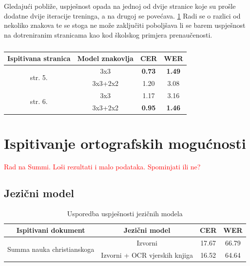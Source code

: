 \documentclass[zavrsnirad]{fer}
\begin{document}
Gledajući pobliže, uspješnost opada na jednoj od dvije stranice koje su prošle dodatne dvije iteracije treninga, a na drugoj se povećava. \ref{tab:pages5and6} Radi se o razlici od nekoliko znakova te se stoga ne može zaključiti poboljšava li se barem uspješnost na dotreniranim stranicama kao kod školskog primjera prenaučenosti.


\bgroup
\def\arraystretch{1.25}
\begin{table}[hbt]
	\centering
	\begin{tabular}{|c|c|c|c|}
		\hline
		\textbf{Ispitivana stranica} & \textbf{Model znakovlja} & \textbf{CER} & \textbf{WER} \\ \hline
		\multirow{2}{*}{str. 5.} & 3x3 & \textbf{0.73} & \textbf{1.49} \\ \cline{2-4}
								 & 3x3+2x2 & 1.20 & 3.08 \\ \hline
		\multirow{2}{*}{str. 6.} & 3x3 & 1.17 & 3.16 \\ \cline{2-4}
								 & 3x3+2x2 & \textbf{0.95} & \textbf{1.46} \\ \hline
	\end{tabular}
	\caption{}
	\label{tab:pages5and6}
\end{table}
\egroup

\FloatBarrier

\section{Ispitivanje ortografskih mogućnosti}

\textcolor{red}{Rad na Summi. Loši rezultati i malo podataka. Spominjati ili ne?}

\subsection{Jezični model}

\bgroup
\def\arraystretch{1.25}
\begin{table}[h]
	\centering
	\begin{tabular}{|c|c|c|c|}
		\hline
		\textbf{Ispitivani dokument} & \textbf{Jezični model} & \textbf{CER} & \textbf{WER} \\ \hline
		\multirow{2}{*}{Summa nauka christianskoga} & Izvorni & 17.67 & 66.79 \\ \cline{2-4}
		& Izvorni + OCR vjerskih knjiga & 16.52 & 64.64 \\ \hline
	\end{tabular}
	\caption{Usporedba uspješnosti jezičnih modela}
	\label{tab:ortography_performance}
\end{table}
\egroup
\end{document}
